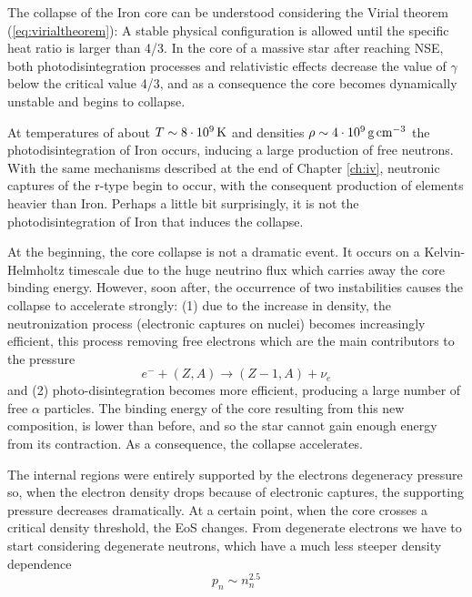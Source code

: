 \par The collapse of the Iron core can be understood considering the Virial theorem (\ref{eq:virialtheorem}): A stable physical configuration is allowed until the specific heat ratio is larger than 4/3. In the core of a massive star after reaching NSE, both photodisintegration processes and relativistic effects decrease the value of $\gamma$ below the critical value 4/3, and as a consequence the core becomes dynamically unstable and begins to collapse.
\par At temperatures of about $T\sim 8\cdot 10^{9}\,\text{K}$ and densities $\rho \sim 4\cdot 10^{9}\,\text{g}\,\text{cm}^{-3}$ the photodisintegration of Iron occurs, inducing a large production of free neutrons. With the same mechanisms described at the end of Chapter \ref{ch:iv}, neutronic captures of the r-type begin to occur, with the consequent production of elements heavier than Iron. Perhaps a little bit surprisingly, it is not the photodisintegration of Iron that induces the collapse.
\par At the beginning, the core collapse is not a dramatic event. It occurs on a Kelvin-Helmholtz timescale due to the huge neutrino flux which carries away the core binding energy. However, soon after, the occurrence of two instabilities causes the collapse to accelerate strongly: (1) due to the increase in density, the neutronization process (electronic captures on nuclei) becomes increasingly efficient, this process removing free electrons which are the main contributors to the pressure
\begin{equation*}
    e^{-}+(Z,A)\to (Z-1,A)+\nu_{e}
\end{equation*}
and (2) photo-disintegration becomes more efficient, producing a large number of free $\alpha$ particles. The binding energy of the core resulting from this new composition, is lower than before, and so the star cannot gain enough energy from its contraction. As a consequence, the collapse accelerates.
\par The internal regions were entirely supported by the electrons degeneracy pressure so, when the electron density drops because of electronic captures, the supporting pressure decreases dramatically. At a certain point, when the core crosses a critical density threshold, the EoS changes. From degenerate electrons we have to start considering degenerate neutrons, which have a much less steeper density dependence
\begin{equation*}
    p_{n} \sim n_{n}^{2.5}
\end{equation*}
